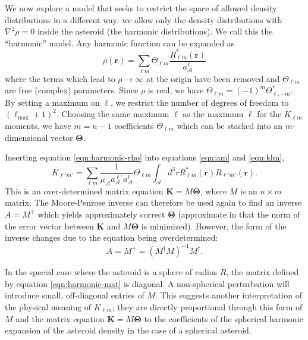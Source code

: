 We now explore a model that seeks to restrict the space of allowed density distributions in a different way: we allow only the density distributions with $\nabla^2 \rho = 0$ inside the asteroid (the harmonic distributions). We  call this  the ``harmonic'' model. Any harmonic function can be expanded as 
\begin{equation}
  \rho(\bm r) = \sum_{\ell m} \Theta_{\ell m}\frac{R_{\ell m}^*(\bm r)}{a_\mathcal{A}^\ell} 
  \label{eqn:harmonic-rho}
\end{equation}
where the terms which lead to $\rho \rightarrow \infty$ at the origin have been removed and $\Theta_{\ell m}$ are free (complex) parameters. Since $\rho$ is real, we have $\Theta_{\ell m}=(-1)^m \Theta_{\ell,-m}^*$. By setting a maximum on $\ell$, we restrict the number of degrees of freedom to $(\ell_\mathrm{max}+ 1)^2$. Choosing the same maximum $\ell$ as the maximum $\ell$ for the $K_{\ell m}$ moments, we have $m=n-1$ coefficients $\Theta_{\ell m}$ which can be stacked into an $m$-dimensional vector $\bm \Theta$.

Inserting equation \ref{eqn:harmonic-rho} into equations \ref{eqn:am} and \ref{eqn:klm},
\begin{equation}
  K_{\ell' m'} = \sum_{\ell m} \frac{1}{\mu_\mathcal{A} a_\mathcal{A}^{\ell'} a_\mathcal{A}^\ell} \Theta_{\ell m} \int_\mathcal{A} d^3 r R_{\ell m}^*(\bm r) R_{\ell' m'}(\bm r).
  \label{eqn:harmonic-mat}
\end{equation}
This is an over-determined matrix equation $\bm K = M \bm \Theta$, where $M$ is an $n \times m$ matrix. The Moore-Penrose inverse can therefore be used again to find an inverse $A=M^+$ which yields approximately correct $\bm \Theta$ (approximate in that the norm of the error vector between $\bm K$ and $M \bm \Theta$ is minimized). However, the form of the inverse changes due to the equation being overdetermined:
\begin{equation}
  A=M^+ = (M^\dagger M)^{-1} M^\dagger .
  \label{eqn:mpi-overdetermined}
\end{equation}

In the special case where the asteroid is a sphere of radius $R$, the matrix defined by equation \ref{eqn:harmonic-mat} is diagonal. %
A non-spherical perturbation will introduce small, off-diagonal entries of $M$. This suggests another interpretation of the physical meaning of $K_{\ell m}$; they are directly proportional through this form of $M$ and the matrix equation $\bm K = M \bm \Theta$ to the coefficients of the spherical harmonic expansion of the asteroid density in the case of a spherical asteroid.



